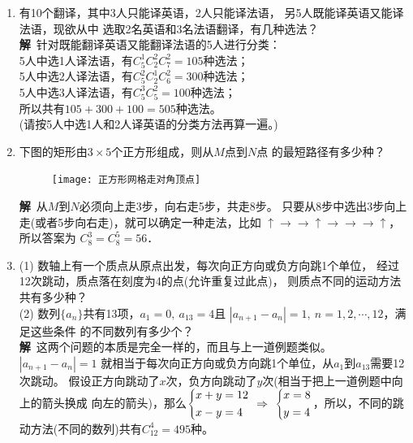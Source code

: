 \begin{enumerate}[label={【\textbf{例\thechapter.\arabic*}】},
 leftmargin=\inteval{\myenumleftmargin}pt,
 itemsep=\inteval{\myenumitempsep}pt,
 itemindent=\inteval{\myenumitemindent}pt]
\item 有10个翻译，其中3人只能译英语，2人只能译法语，
另5人既能译英语又能译法语，现欲从中
选取2名英语和3名法语翻译，有几种选法？\\
\textbf{解}\ 针对既能翻译英语又能翻译法语的5人进行分类：\\
5人中选1人译法语，有$ C_5^1C_2^2C_7^2 = 105 $种选法；\\
5人中选2人译法语，有$ C_5^2C_2^1C_6^2 = 300 $种选法；\\
5人中选3人译法语，有$ C_5^3C_5^2= 100 $种选法； \\
所以共有$ 105 + 300 + 100 = 505 $种选法。\\
(请按5人中选1人和2人译英语的分类方法再算一遍。)


\item 下图的矩形由$ 3\times 5 $个正方形组成，则从$ M $点到$ N $点
的最短路径有多少种？
\begin{figure}[H]
    \centering
    \texttt{[image: 正方形网格走对角顶点]}
\end{figure}
\textbf{解}\ 从$ M $到$ N $必须向上走3步，向右走5步，共走8步。
只要从8步中选出3步向上走(或者5步向右走)，就可以确定一种走法，比如
$\uparrow\rightarrow\rightarrow\uparrow\rightarrow\rightarrow
\rightarrow\uparrow $，所以答案为
$ C_8^3=C_8^5=56 $．

\item (1) 数轴上有一个质点从原点出发，每次向正方向或负方向跳1个单位，
经过12次跳动，质点落在刻度为4的点(允许重复过此点)，
则质点不同的运动方法共有多少种？ \\
(2) 数列$\{a_n\}$共有13项，$a_1 = 0,\ a_{13} = 4$且
$ |a_{n+1}-a_n|=1,\ n=1,2,\cdots,12 $，满足这些条件
的不同数列有多少个？\\
\textbf{解}\ 这两个问题的本质是完全一样的，而且与上一道例题类似。
$ |a_{n+1}-a_n|=1 $
就相当于每次向正方向或负方向跳1个单位，从$a_1$到$a_{13}$需要12次跳动。
假设正方向跳动了$x$次，负方向跳动了$y$次(相当于把上一道例题中向上的箭头换成
向左的箭头)，那么$\begin{dcases}
    x+y=12 \\
    x-y=4
\end{dcases} \ \Rightarrow \ \begin{dcases}
    x=8 \\
    y=4
\end{dcases} $，所以，不同的跳动方法(不同的数列)共有$C_{12}^4=495 $种。


\end{enumerate}
